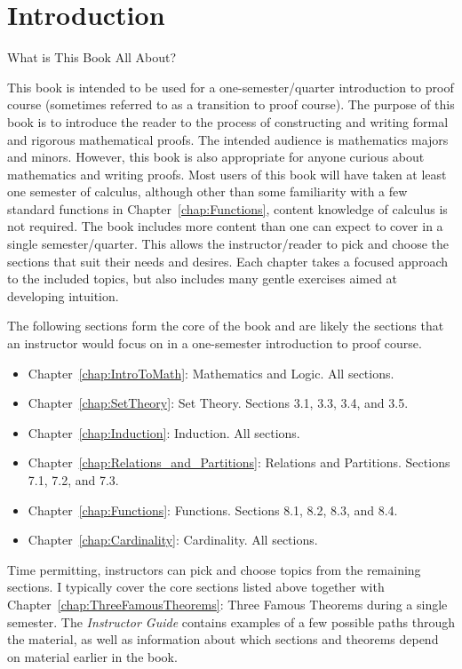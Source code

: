 \chapter{Introduction}\label{chap:intro}


\begin{section}{What is This Book All About?}\label{sec:WhatIsThisBookAllAbout}

This book is intended to be used for a one-semester/quarter introduction to proof course (sometimes referred to as a transition to proof course). The purpose of this book is to introduce the reader to the process of constructing and writing formal and rigorous mathematical proofs. The intended audience is mathematics majors and minors. However, this book is also appropriate for anyone curious about mathematics and writing proofs. Most users of this book will have taken at least one semester of calculus, although other than some familiarity with a few standard functions in Chapter~\ref{chap:Functions}, content knowledge of calculus is not required. The book includes more content than one can expect to cover in a single semester/quarter. This allows the instructor/reader to pick and choose the sections that suit their needs and desires. Each chapter takes a focused approach to the included topics, but also includes many gentle exercises aimed at developing intuition.

The following sections form the core of the book and are likely the sections that an instructor would focus on in a one-semester introduction to proof course.
\begin{itemize}
\item Chapter~\ref{chap:IntroToMath}: Mathematics and Logic. All sections.
\item Chapter~\ref{chap:SetTheory}: Set Theory. Sections 3.1, 3.3, 3.4, and 3.5.
\item Chapter~\ref{chap:Induction}: Induction. All sections.
\item Chapter~\ref{chap:Relations_and_Partitions}: Relations and Partitions. Sections 7.1, 7.2, and 7.3.
\item Chapter~\ref{chap:Functions}: Functions. Sections 8.1, 8.2, 8.3, and 8.4.
\item Chapter~\ref{chap:Cardinality}: Cardinality. All sections.
\end{itemize}
Time permitting, instructors can pick and choose topics from the remaining sections.  I typically cover the core sections listed above together with Chapter~\ref{chap:ThreeFamousTheorems}: Three Famous Theorems during a single semester. The \emph{Instructor Guide} contains examples of a few possible paths through the material, as well as information about which sections and theorems depend on material earlier in the book.


\end{section}

